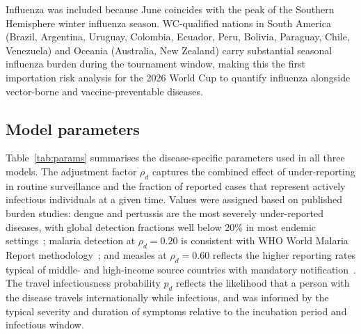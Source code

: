 \documentclass[12pt]{article}
\begin{document}
Influenza was included because June coincides with the peak of the
Southern Hemisphere winter influenza season. WC-qualified nations in
South America (Brazil, Argentina, Uruguay, Colombia, Ecuador, Peru,
Bolivia, Paraguay, Chile, Venezuela) and Oceania (Australia, New
Zealand) carry substantial seasonal influenza burden during the
tournament window, making this the first importation risk analysis for
the 2026 World Cup to quantify influenza alongside vector-borne and
vaccine-preventable diseases.

\subsection*{Model parameters}

Table~\ref{tab:params} summarises the disease-specific parameters
used in all three models. The adjustment factor $\rho_d$ captures the
combined effect of under-reporting in routine surveillance and the
fraction of reported cases that represent actively infectious
individuals at a given time. Values were assigned based on published
burden studies: dengue and pertussis are the most severely
under-reported diseases, with global detection fractions well below
20\% in most endemic settings~\cite{bhatt2013,undurraga2013,mclaughlin2016};
malaria detection at $\rho_d = 0.20$ is consistent with WHO World
Malaria Report methodology~\cite{whoWMR2024}; and measles at
$\rho_d = 0.60$ reflects the higher reporting rates typical of
middle- and high-income source countries with mandatory
notification~\cite{simons2012}.
The travel infectiousness probability $p_d$ reflects the likelihood
that a person with the disease travels internationally while
infectious, and was informed by the typical severity and duration of
symptoms relative to the incubation period and infectious window.
\end{document}
